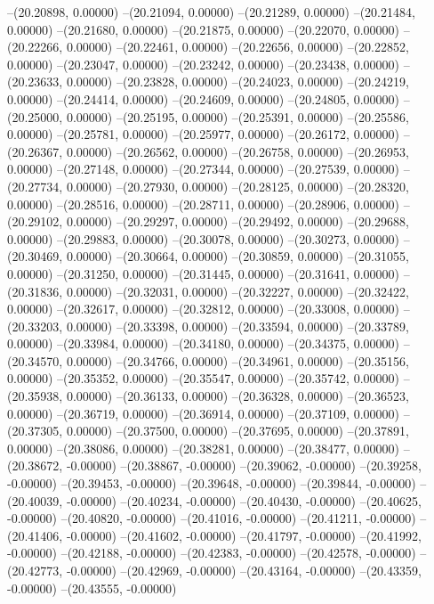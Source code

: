 --(20.20898, 0.00000)
--(20.21094, 0.00000)
--(20.21289, 0.00000)
--(20.21484, 0.00000)
--(20.21680, 0.00000)
--(20.21875, 0.00000)
--(20.22070, 0.00000)
--(20.22266, 0.00000)
--(20.22461, 0.00000)
--(20.22656, 0.00000)
--(20.22852, 0.00000)
--(20.23047, 0.00000)
--(20.23242, 0.00000)
--(20.23438, 0.00000)
--(20.23633, 0.00000)
--(20.23828, 0.00000)
--(20.24023, 0.00000)
--(20.24219, 0.00000)
--(20.24414, 0.00000)
--(20.24609, 0.00000)
--(20.24805, 0.00000)
--(20.25000, 0.00000)
--(20.25195, 0.00000)
--(20.25391, 0.00000)
--(20.25586, 0.00000)
--(20.25781, 0.00000)
--(20.25977, 0.00000)
--(20.26172, 0.00000)
--(20.26367, 0.00000)
--(20.26562, 0.00000)
--(20.26758, 0.00000)
--(20.26953, 0.00000)
--(20.27148, 0.00000)
--(20.27344, 0.00000)
--(20.27539, 0.00000)
--(20.27734, 0.00000)
--(20.27930, 0.00000)
--(20.28125, 0.00000)
--(20.28320, 0.00000)
--(20.28516, 0.00000)
--(20.28711, 0.00000)
--(20.28906, 0.00000)
--(20.29102, 0.00000)
--(20.29297, 0.00000)
--(20.29492, 0.00000)
--(20.29688, 0.00000)
--(20.29883, 0.00000)
--(20.30078, 0.00000)
--(20.30273, 0.00000)
--(20.30469, 0.00000)
--(20.30664, 0.00000)
--(20.30859, 0.00000)
--(20.31055, 0.00000)
--(20.31250, 0.00000)
--(20.31445, 0.00000)
--(20.31641, 0.00000)
--(20.31836, 0.00000)
--(20.32031, 0.00000)
--(20.32227, 0.00000)
--(20.32422, 0.00000)
--(20.32617, 0.00000)
--(20.32812, 0.00000)
--(20.33008, 0.00000)
--(20.33203, 0.00000)
--(20.33398, 0.00000)
--(20.33594, 0.00000)
--(20.33789, 0.00000)
--(20.33984, 0.00000)
--(20.34180, 0.00000)
--(20.34375, 0.00000)
--(20.34570, 0.00000)
--(20.34766, 0.00000)
--(20.34961, 0.00000)
--(20.35156, 0.00000)
--(20.35352, 0.00000)
--(20.35547, 0.00000)
--(20.35742, 0.00000)
--(20.35938, 0.00000)
--(20.36133, 0.00000)
--(20.36328, 0.00000)
--(20.36523, 0.00000)
--(20.36719, 0.00000)
--(20.36914, 0.00000)
--(20.37109, 0.00000)
--(20.37305, 0.00000)
--(20.37500, 0.00000)
--(20.37695, 0.00000)
--(20.37891, 0.00000)
--(20.38086, 0.00000)
--(20.38281, 0.00000)
--(20.38477, 0.00000)
--(20.38672, -0.00000)
--(20.38867, -0.00000)
--(20.39062, -0.00000)
--(20.39258, -0.00000)
--(20.39453, -0.00000)
--(20.39648, -0.00000)
--(20.39844, -0.00000)
--(20.40039, -0.00000)
--(20.40234, -0.00000)
--(20.40430, -0.00000)
--(20.40625, -0.00000)
--(20.40820, -0.00000)
--(20.41016, -0.00000)
--(20.41211, -0.00000)
--(20.41406, -0.00000)
--(20.41602, -0.00000)
--(20.41797, -0.00000)
--(20.41992, -0.00000)
--(20.42188, -0.00000)
--(20.42383, -0.00000)
--(20.42578, -0.00000)
--(20.42773, -0.00000)
--(20.42969, -0.00000)
--(20.43164, -0.00000)
--(20.43359, -0.00000)
--(20.43555, -0.00000)

